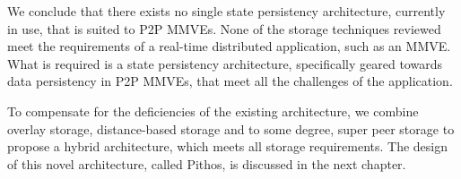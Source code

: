 We conclude that there exists no single state persistency architecture, currently in use, that is suited to P2P MMVEs. None of the storage techniques reviewed meet the requirements of a real-time distributed application, such as an MMVE. What is required is a state persistency architecture, specifically geared towards data persistency in P2P MMVEs, that meet all the challenges of the application.

To compensate for the deficiencies of the existing architecture, we combine overlay storage, distance-based storage and to some degree, super peer storage to propose a hybrid architecture, which meets all storage requirements. The design of this novel architecture, called Pithos, is discussed in the next chapter.
